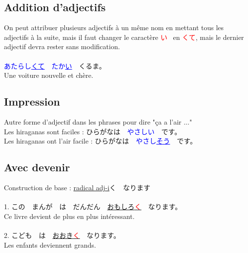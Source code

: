 \documentclass[11pt]{report}
\newenvironment{Japanese}{%
\CJKfamily{min}%
\CJKtilde  
\CJKnospace}{}
\begin{document}
\subsection{Addition d'adjectifs}

\begin{CJK}{UTF8}{}  
\begin{Japanese}
	On peut attribuer plusieurs adjectifs à un même nom en mettant tous les adjectifs à la suite, mais il faut changer le caractère \textcolor{red}{い} \, en \textcolor{red}{くて}, mais le dernier adjectif devra rester sans modification. \\ \\
	\textcolor{blue}{あたらし\underline{くて}}　\textcolor{blue}{たか\underline{い}}　くるま。 \\
	Une voiture nouvelle et chère.
\end{Japanese}  
\end{CJK}

\subsection{Impression}


\begin{CJK}{UTF8}{}  
\begin{Japanese}
	\begin{flushleft}
	Autre forme d'adjectif dans les phrases pour dire "ça a l'air ..." \\
	Les hiraganas sont faciles : ひらがなは　\textcolor{blue}{やさしい}　です。 \\
	Les hiraganas ont l'air facile : ひらがなは　\textcolor{blue}{やさし\underline{そう}}　です。
	\end{flushleft}
\end{Japanese}  
\end{CJK}

\subsection{Avec devenir}

\begin{CJK}{UTF8}{}  
\begin{Japanese}
	Construction de base : \underline{radical adj-i}く　なります \\ \\
	1. この　まんが　は　だんだん　\underline{おもしろ\textcolor{red}{く}}　なります。 \\
	Ce livre devient de plus en plus intéressant. \\ \\
	2. こども　は　\underline{おおき\textcolor{red}{く}}　なります。 \\
	Les enfants deviennent grands.
\end{Japanese}  
\end{CJK}
\end{document}
